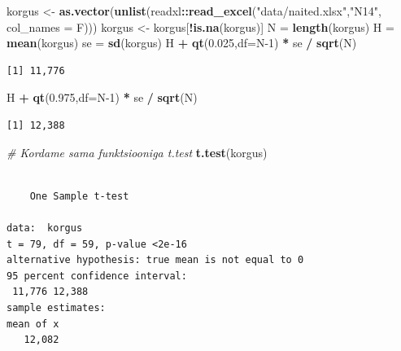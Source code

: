 \documentclass[
]{book}
\newenvironment{Shaded}{\begin{snugshade}}{\end{snugshade}}
\newcommand{\AttributeTok}[1]{\textcolor[rgb]{0.13,0.29,0.53}{#1}}
\newcommand{\CommentTok}[1]{\textcolor[rgb]{0.56,0.35,0.01}{\textit{#1}}}
\newcommand{\DecValTok}[1]{\textcolor[rgb]{0.00,0.00,0.81}{#1}}
\newcommand{\FloatTok}[1]{\textcolor[rgb]{0.00,0.00,0.81}{#1}}
\newcommand{\FunctionTok}[1]{\textcolor[rgb]{0.13,0.29,0.53}{\textbf{#1}}}
\newcommand{\NormalTok}[1]{#1}
\newcommand{\OtherTok}[1]{\textcolor[rgb]{0.56,0.35,0.01}{#1}}
\newcommand{\SpecialCharTok}[1]{\textcolor[rgb]{0.81,0.36,0.00}{\textbf{#1}}}
\newcommand{\StringTok}[1]{\textcolor[rgb]{0.31,0.60,0.02}{#1}}
\renewenvironment{Shaded} {\begin{snugshade}\footnotesize} {\end{snugshade}}
\begin{document}
\begin{Shaded}
\begin{Highlighting}[]
\NormalTok{korgus }\OtherTok{\textless{}{-}} \FunctionTok{as.vector}\NormalTok{(}\FunctionTok{unlist}\NormalTok{(readxl}\SpecialCharTok{::}\FunctionTok{read\_excel}\NormalTok{(}\StringTok{"data/naited.xlsx"}\NormalTok{,}\StringTok{"N14"}\NormalTok{, }\AttributeTok{col\_names =}\NormalTok{ F)))}
\NormalTok{korgus }\OtherTok{\textless{}{-}}\NormalTok{ korgus[}\SpecialCharTok{!}\FunctionTok{is.na}\NormalTok{(korgus)]}
\NormalTok{N }\OtherTok{=} \FunctionTok{length}\NormalTok{(korgus)}
\NormalTok{H }\OtherTok{=} \FunctionTok{mean}\NormalTok{(korgus)}
\NormalTok{se }\OtherTok{=} \FunctionTok{sd}\NormalTok{(korgus)}
\NormalTok{H }\SpecialCharTok{+} \FunctionTok{qt}\NormalTok{(}\FloatTok{0.025}\NormalTok{,}\AttributeTok{df=}\NormalTok{N}\DecValTok{{-}1}\NormalTok{) }\SpecialCharTok{*}\NormalTok{ se }\SpecialCharTok{/} \FunctionTok{sqrt}\NormalTok{(N)}
\end{Highlighting}
\end{Shaded}

\begin{verbatim}
[1] 11,776
\end{verbatim}

\begin{Shaded}
\begin{Highlighting}[]
\NormalTok{H }\SpecialCharTok{+} \FunctionTok{qt}\NormalTok{(}\FloatTok{0.975}\NormalTok{,}\AttributeTok{df=}\NormalTok{N}\DecValTok{{-}1}\NormalTok{) }\SpecialCharTok{*}\NormalTok{ se }\SpecialCharTok{/} \FunctionTok{sqrt}\NormalTok{(N)}
\end{Highlighting}
\end{Shaded}

\begin{verbatim}
[1] 12,388
\end{verbatim}

\begin{Shaded}
\begin{Highlighting}[]
\CommentTok{\# Kordame sama funktsiooniga t.test}
\FunctionTok{t.test}\NormalTok{(korgus)}
\end{Highlighting}
\end{Shaded}

\begin{verbatim}

    One Sample t-test

data:  korgus
t = 79, df = 59, p-value <2e-16
alternative hypothesis: true mean is not equal to 0
95 percent confidence interval:
 11,776 12,388
sample estimates:
mean of x 
   12,082 
\end{verbatim}
\end{document}
